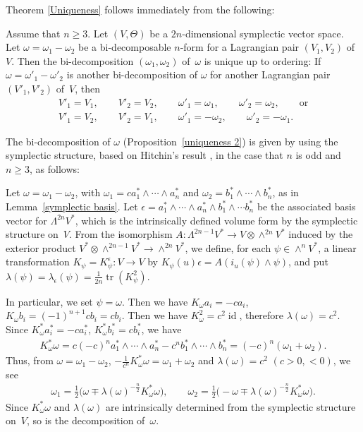 Theorem \ref{Uniqueness} follows immediately from the following:

\begin{Prop}
\label{uniqueness 2}
Assume that $n\geq 3$.
Let $(V,\Theta)$ be a $2n$-dimensional symplectic vector space.
Let $\omega=\omega_1-\omega_2$ be a bi-decomposable
$n$-form for a Lagrangian pair $(V_1, V_2)$ of $V$.
Then the bi-decomposition $(\omega_1, \omega_2)$ of~$\omega$
is unique up to ordering:
If $\omega=\omega'_1-\omega'_2$ is another bi-decomposition
of $\omega$ for another Lagrangian pair $(V'_1, V'_2)$ of~$V$, then
\begin{gather*}
V'_1 = V_1, \qquad V'_2 = V_2, \qquad \omega'_1 = \omega_1, \qquad \omega'_2 = \omega_2,
\qquad {\mathrm{or}} \\
V'_1 = V_2, \qquad V'_2 = V_1, \qquad \omega'_1 = - \omega_2, \qquad \omega'_2 = - \omega_1.
\end{gather*}
\end{Prop}



The bi-decomposition of $\omega$ (Proposition~\ref{uniqueness 2})
is given by using the symplectic structure,
based on Hitchin's result \cite[Propositions 2.1,~2.2]{H},
in the case that $n$ is odd and $n \geq 3$, as follows:

Let $\omega = \omega_1 - \omega_2$, with
$\omega_1 = c a_1^*\wedge \cdots \wedge a_n^*$
and
$\omega_2 = b_1^*\wedge \cdots \wedge b_n^*$, as in
Lemma~\ref{symplectic basis}.
Let $\epsilon=a^*_1\wedge \cdots \wedge a^*_n
\wedge b^*_1\wedge \cdots b^*_n$
be the associated basis vector for $\Lambda^{2n}V^*$,
which is the
intrinsically def\/ined volume form by the symplectic structure on~$V$.
From the isomorphism $A\colon \Lambda^{2n-1}V^* \longrightarrow
V\otimes \wedge^{2n}V^*$ induced by the exterior product
$V^*\otimes\wedge^{2n-1}V^* \to \wedge^{2n}V^*$,
we def\/ine, for each $\psi \in \wedge^nV^*$,
a linear transformation
$K_{\psi}=K_{\psi}^{\epsilon}\colon V \longrightarrow V$ by
$K_{\psi}(u)\epsilon = A(i_u(\psi)\wedge \psi)$, and put
$\lambda(\psi)=\lambda_{\epsilon}(\psi)=
\frac{1}{2n}\operatorname{tr}(K_{\psi}^2)$.

In particular, we set $\psi = \omega$.
Then we have $K_{\omega}a_i=-c a_i$, $K_{\omega}b_i
= (-1)^{n+1} c b_i = cb_i$.
Then we have $K_{\omega}^2 = c^2\operatorname{id}$,
therefore $\lambda(\omega) = c^2$.
Since $K_{\omega}^*a_i^* = -ca_i^*$, $K_{\omega}^*b_i^* =cb_i^* $,
we have
\begin{gather*}
K_{\omega}^*\omega = c(-c)^n a^*_1\wedge \cdots \wedge a^*_n -
c^{n}b^*_1\wedge \cdots \wedge b^*_n =
(-c)^n(\omega_1 + \omega_2).
\end{gather*}
Thus, from
$\omega={\omega}_1-{\omega}_2$, $-\frac{1}{c^n}K_{\omega}^*\omega={\omega}_1+{\omega}_2$
and $\lambda(\omega) = c^2$ $(c >0, <0)$,
we see
\begin{gather*}
\omega_1 = \frac{1}{2}\big(\omega \mp \lambda(\omega)^{-\frac{n}{2}}
K_{\omega}^*\omega\big),\qquad
\omega_2= \frac{1}{2}\big({-}\omega \mp \lambda(\omega)^{-\frac{n}{2}}
K_{\omega}^*\omega\big).
\end{gather*}
Since $K_{\omega}^*\omega$ and $\lambda(\omega)$ are
intrinsically determined from the symplectic structure on~$V$,
so is the decomposition of~$\omega$.

